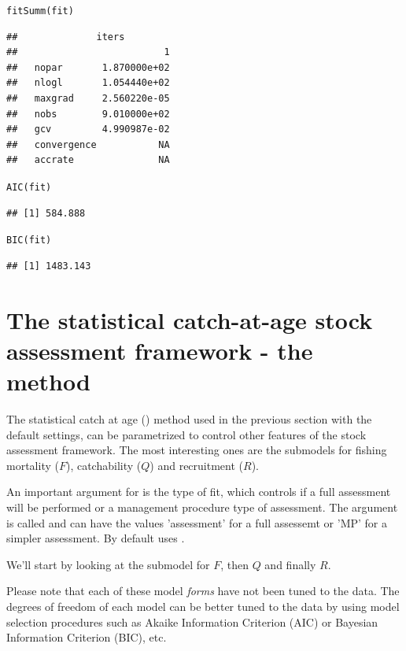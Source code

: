 \documentclass[a4paper,english,10pt]{article}\usepackage[]{graphicx}\usepackage[]{color}
\makeatletter
\newcommand{\hlstd}[1]{\textcolor[rgb]{0.196,0.196,0.196}{#1}}%
\newcommand{\hlkwd}[1]{\textcolor[rgb]{0.78,0.227,0.412}{#1}}%
\newenvironment{kframe}{%
 \def\at@end@of@kframe{}%
 \ifinner\ifhmode%
  \def\at@end@of@kframe{\end{minipage}}%
  \begin{minipage}{\columnwidth}%
 \fi\fi%
 \def\FrameCommand##1{\hskip\@totalleftmargin \hskip-\fboxsep
 \colorbox{shadecolor}{##1}\hskip-\fboxsep
     \hskip-\linewidth \hskip-\@totalleftmargin \hskip\columnwidth}%
 \MakeFramed {\advance\hsize-\width
   \@totalleftmargin\z@ \linewidth\hsize
   \@setminipage}}%
 {\par\unskip\endMakeFramed%
 \at@end@of@kframe}
\newenvironment{knitrout}{}{} %
\makeatother
\begin{document}
\begin{knitrout}
\color{fgcolor}\begin{kframe}
\begin{alltt}
\hlkwd{fitSumm}\hlstd{(fit)}
\end{alltt}
\begin{verbatim}
##              iters
##                          1
##   nopar       1.870000e+02
##   nlogl       1.054440e+02
##   maxgrad     2.560220e-05
##   nobs        9.010000e+02
##   gcv         4.990987e-02
##   convergence           NA
##   accrate               NA
\end{verbatim}
\begin{alltt}
\hlkwd{AIC}\hlstd{(fit)}
\end{alltt}
\begin{verbatim}
## [1] 584.888
\end{verbatim}
\begin{alltt}
\hlkwd{BIC}\hlstd{(fit)}
\end{alltt}
\begin{verbatim}
## [1] 1483.143
\end{verbatim}
\end{kframe}
\end{knitrout}

\section{The statistical catch-at-age stock assessment framework - the  method}

The statistical catch at age () method used in the previous section with the default settings, can be parametrized to control other features of the stock assessment framework. The most interesting ones are the submodels for fishing mortality ($F$), catchability ($Q$) and recruitment ($R$).

An important argument for  is the type of fit, which controls if a full assessment will be performed or a management procedure type of assessment. The argument is called  and can have the values 'assessment' for a full assessemt or 'MP' for a simpler assessment. By default  uses .

We'll start by looking at the submodel for $F$, then $Q$ and finally $R$.

Please note that each of these model \emph{forms} have not been tuned to the data. The degrees of freedom of each model can be better tuned to the data by using model selection procedures such as Akaike Information Criterion (AIC) or Bayesian Information Criterion (BIC), etc.
\end{document}
